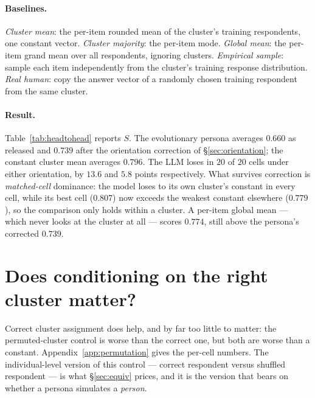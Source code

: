 \documentclass[11pt]{article}
\begin{document}
\paragraph{Baselines.} \textit{Cluster mean}: the per-item rounded mean of the
cluster's training respondents, one constant vector. \textit{Cluster majority}:
the per-item mode. \textit{Global mean}: the per-item grand mean over all
respondents, ignoring clusters. \textit{Empirical sample}: sample each item
independently from the cluster's training response distribution. \textit{Real
human}: copy the answer vector of a randomly chosen training respondent from the
same cluster.

\paragraph{Result.} Table~\ref{tab:headtohead} reports $S$. The evolutionary
persona averages $0.660$ as released and $0.739$ after the orientation
correction of \S\ref{sec:orientation}; the constant cluster mean averages
$0.796$. The LLM loses in $20$ of $20$ cells under either orientation, by $13.6$
and $5.8$ points respectively. What survives correction is \emph{matched-cell}
dominance: the model loses to its own cluster's constant in every cell, while its
best cell ($0.807$) now exceeds the weakest constant elsewhere ($0.779$), so the
comparison only holds within a cluster. A per-item global mean --- which never
looks at the cluster at all --- scores $0.774$, still above the persona's
corrected $0.739$.

\begin{table}[t]\centering\small

\caption{Answer similarity $S$ on the original system's own test IDs, in the
\emph{original} orientation; correction adds $0.079$ on average and preserves
all $20$ matched constant wins, though it does reorder the models. The constant
(bold) beats every LLM in every cell; a real human scores below it.}
\label{tab:headtohead}
\end{table}

\section{Does conditioning on the right cluster matter?}
\label{sec:permutation}

Correct cluster assignment does help, and by far too little to matter: the
permuted-cluster control is worse than the correct one, but both are worse
than a constant. Appendix~\ref{app:permutation} gives the per-cell numbers.
The individual-level version of this control --- correct respondent versus
shuffled respondent --- is what \S\ref{sec:equiv} prices, and it is the
version that bears on whether a persona simulates a \emph{person}.
\end{document}
